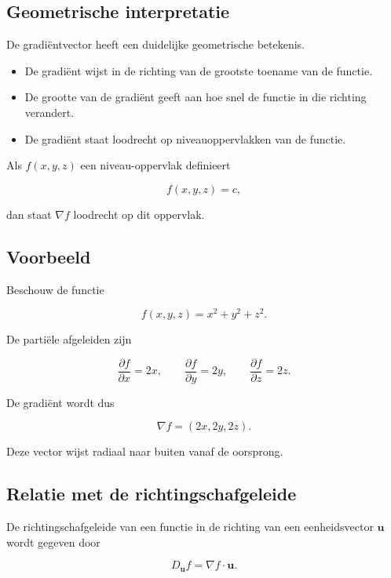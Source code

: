 \documentclass[11pt,a4paper]{article}
\begin{document}
    \subsection{Geometrische interpretatie}

    De gradiëntvector heeft een duidelijke geometrische betekenis.

    \begin{itemize}
        \item De gradiënt wijst in de richting van de grootste toename van de functie.
        \item De grootte van de gradiënt geeft aan hoe snel de functie in die richting
        verandert.
        \item De gradiënt staat loodrecht op niveauoppervlakken van de functie.
    \end{itemize}

    Als $f(x,y,z)$ een niveau-oppervlak definieert

    \[
        f(x,y,z)=c,
    \]

    dan staat $\nabla f$ loodrecht op dit oppervlak.

    \subsection{Voorbeeld}

    Beschouw de functie

    \[
        f(x,y,z)=x^2+y^2+z^2.
    \]

    De partiële afgeleiden zijn

    \[
        \frac{\partial f}{\partial x}=2x,
        \qquad
        \frac{\partial f}{\partial y}=2y,
        \qquad
        \frac{\partial f}{\partial z}=2z.
    \]

    De gradiënt wordt dus

    \[
        \nabla f = (2x,2y,2z).
    \]

    Deze vector wijst radiaal naar buiten vanaf de oorsprong.

    \subsection{Relatie met de richtingschafgeleide}

    De richtingschafgeleide van een functie in de richting van een eenheidsvector
    $\mathbf{u}$ wordt gegeven door

    \[
        D_{\mathbf{u}} f = \nabla f \cdot \mathbf{u}.
    \]
\end{document}
